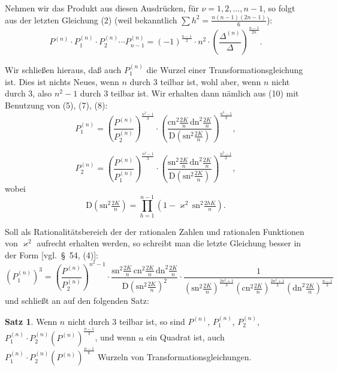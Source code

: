 \documentclass[12pt,a4paper]{article}
\theoremstyle{definition}
\newtheorem*{satz}{Satz}
\begin{document}
Nehmen wir das Produkt aus diesen Ausdrücken, für $\nu = 1, 2, \ldots, n-1$, so folgt aus der letzten Gleichung (2) (weil bekanntlich $\sum h^2 = \frac{n(n-1)(2n-1)}{6}$):
\begin{equation}\label{eq:67-10}
P^{(n)} \cdot P^{(n)}_1 \cdot P^{(n)}_2 \cdots P^{(n)}_{n-1} = (-1)^{\frac{n-1}{2}} \cdot n^2 \cdot \left(\frac{\Delta^{(n)}}{\Delta}\right)^{\frac{n-1}{2n}}.
\end{equation}

Wir schließen hieraus, daß auch $P^{(n)}_1$ die Wurzel einer Transformationsgleichung ist. Dies ist nichts Neues, wenn $n$ durch 3 teilbar ist, wohl aber, wenn $n$ nicht durch 3, also $n^2-1$ durch 3 teilbar ist. Wir erhalten dann nämlich aus (10) mit Benutzung von (5), (7), (8):
\begin{equation}\label{eq:67-11}
P^{(n)}_1 = \left(\frac{P^{(n)}}{P^{(n)}_2}\right)^{\frac{n^2-1}{3}} \cdot \left(\frac{\mathrm{cn}^2\frac{2K}{n}\,\mathrm{dn}^2\frac{2K}{n}}{\mathrm{D}(\mathrm{sn}^2\frac{2K}{n})}\right)^{\frac{n^2-1}{3}},
\end{equation}

\begin{equation}\label{eq:67-12}
P^{(n)}_2 = \left(\frac{P^{(n)}}{P^{(n)}_1}\right)^{\frac{n^2-1}{3}} \cdot \left(\frac{\mathrm{sn}^2\frac{2K}{n}\,\mathrm{dn}^2\frac{2K}{n}}{\mathrm{D}(\mathrm{sn}^2\frac{2K}{n})}\right)^{\frac{n^2-1}{3}},
\end{equation}
wobei
\[
\mathrm{D}(\mathrm{sn}^2\tfrac{2K}{n}) = \prod_{h=1}^{n-1} (1 - \varkappa^2\,\mathrm{sn}^2\tfrac{2hK}{n}).
\]

Soll als Rationalitätsbereich der der rationalen Zahlen und rationalen Funktionen von $\varkappa^2$ aufrecht erhalten werden, so schreibt man die letzte Gleichung besser in der Form [vgl.\ \S\ 54, (4)]:
\begin{equation}\label{eq:67-13}
\left(P^{(n)}_1\right)^3 = \left(\frac{P^{(n)}}{P^{(n)}_2}\right)^{n^2-1} \cdot \frac{\mathrm{sn}^2\frac{2K}{n}\,\mathrm{cn}^2\frac{2K}{n}\,\mathrm{dn}^2\frac{2K}{n}}{\mathrm{D}(\mathrm{sn}^2\frac{2K}{n})^2} \cdot \frac{1}{(\mathrm{sn}^2\frac{2K}{n})^{\frac{2n^2+1}{3}} (\mathrm{cn}^2\frac{2K}{n})^{\frac{2n^2+1}{3}} (\mathrm{dn}^2\frac{2K}{n})^{\frac{n-1}{3}}}
\end{equation}
und schließt an auf den folgenden Satz:

\begin{satz}
Wenn $n$ nicht durch 3 teilbar ist, so sind $P^{(n)}$, $P^{(n)}_1$, $P^{(n)}_2$, $P^{(n)}_1 \cdot P^{(n)}_2 (P^{(n)})^{\frac{n-1}{3}}$, und wenn $n$ ein Quadrat ist, auch $P^{(n)}_1 \cdot P^{(n)}_2 (P^{(n)})^{\frac{n-1}{6}}$ Wurzeln von Transformationsgleichungen.
\end{satz}
\end{document}
